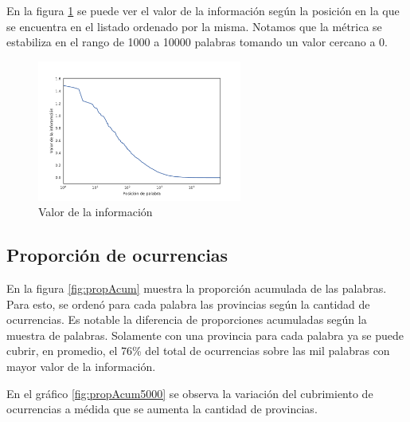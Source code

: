 En la figura \ref{fig:ivalue} se puede ver el valor de la información según la posición en la que se encuentra en el listado ordenado por la misma. Notamos que la métrica se estabiliza en el rango de 1000 a 10000 palabras tomando un valor cercano a 0.


\begin{figure}[ht]
\centering
\includegraphics[width=0.6\textwidth]{./images/ivaluesLog.pdf}
\caption{Valor de la información} 
\label{fig:ivalue}
\end{figure}


\subsection{Proporción de ocurrencias} %
\label{sub:proporcionDeOcurrencias}


En la figura \ref{fig:propAcum} muestra la proporción acumulada de las palabras. Para esto, se ordenó para cada palabra las provincias según la cantidad de ocurrencias. Es notable la diferencia de proporciones acumuladas según la muestra de palabras. Solamente con una provincia para cada palabra ya se puede cubrir, en promedio, el 76\% del total de ocurrencias sobre las mil palabras con mayor valor de la información.

En el gráfico \ref{fig:propAcum5000} se observa la variación del cubrimiento de ocurrencias a médida que se aumenta la cantidad de provincias. 



